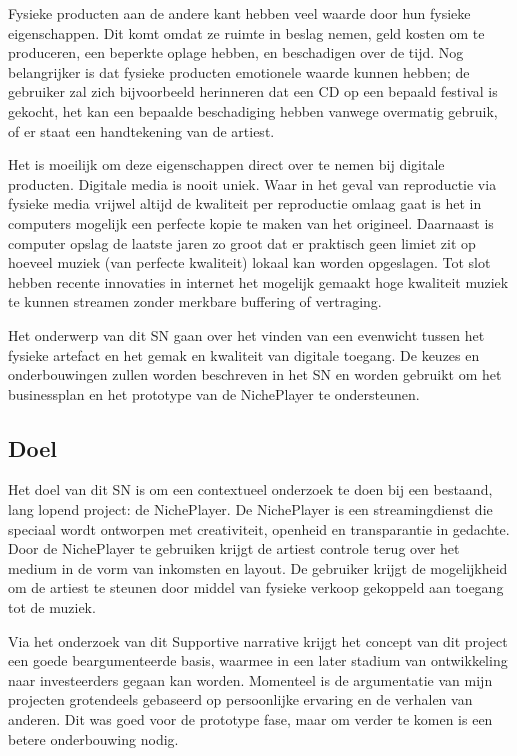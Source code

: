 Fysieke producten aan de andere kant hebben veel waarde door hun fysieke eigenschappen. Dit komt omdat ze ruimte in beslag nemen, geld kosten om te produceren, een beperkte oplage hebben, en beschadigen over de tijd. Nog belangrijker is dat fysieke producten emotionele waarde kunnen hebben; de gebruiker zal zich bijvoorbeeld herinneren dat een CD op een bepaald festival is gekocht, het kan een bepaalde beschadiging hebben vanwege overmatig gebruik, of er staat een handtekening van de artiest.

Het is moeilijk om deze eigenschappen direct over te nemen bij digitale producten. Digitale media is nooit uniek. Waar in het geval van reproductie via fysieke media vrijwel altijd de kwaliteit per reproductie omlaag gaat is het in computers mogelijk een perfecte kopie te maken van het origineel. Daarnaast is computer opslag de laatste jaren zo groot dat er praktisch geen limiet zit op hoeveel muziek (van perfecte kwaliteit) lokaal kan worden opgeslagen. Tot slot hebben recente innovaties in internet het mogelijk gemaakt hoge kwaliteit muziek te kunnen streamen zonder merkbare buffering of vertraging.

Het onderwerp van dit SN gaan over het vinden van een evenwicht tussen het fysieke artefact en het gemak en kwaliteit van digitale toegang. De keuzes en onderbouwingen zullen worden beschreven in het SN en worden gebruikt om het businessplan en het prototype van de NichePlayer te ondersteunen.

\subsection{Doel}
Het doel van dit SN is om een contextueel onderzoek te doen bij een bestaand, lang lopend project: de NichePlayer. De NichePlayer is een streamingdienst die speciaal wordt ontworpen met creativiteit, openheid en transparantie in gedachte. Door de NichePlayer te gebruiken krijgt de artiest controle terug over het medium in de vorm van inkomsten en layout. De gebruiker krijgt de mogelijkheid om de artiest te steunen door middel van fysieke verkoop gekoppeld aan toegang tot de muziek. 

Via het onderzoek van dit Supportive narrative krijgt het concept van dit project een goede beargumenteerde basis, waarmee in een later stadium van ontwikkeling naar investeerders gegaan kan worden. Momenteel is de argumentatie van mijn projecten grotendeels gebaseerd op persoonlijke ervaring en de verhalen van anderen. Dit was goed voor de prototype fase, maar om verder te komen is een betere onderbouwing nodig.

